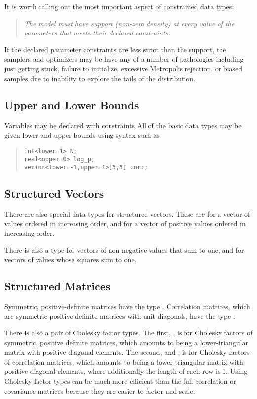 It is worth calling out the most important aspect of constrained data
types: 
%
\begin{quote}
\it
The model must have support (non-zero density) at every value of the
parameters that meets their declared constraints.
\end{quote}
%
If the declared parameter constraints are less strict than the
support, the samplers and optimizers may be have any of a number of
pathologies including just getting stuck, failure to initialize,
excessive Metropolis rejection, or biased samples due to inability to
explore the tails of the distribution.

\subsection{Upper and Lower Bounds}

Variables may be declared with constraints
All of the basic data types may be given lower and upper bounds using
syntax such as
%
\begin{quote}
\begin{Verbatim}
int<lower=1> N;
real<upper=0> log_p;
vector<lower=-1,upper=1>[3,3] corr;
\end{Verbatim}
\end{quote}

\subsection{Structured Vectors}

There are also special data types for structured vectors.  These are
 for a vector of values ordered in increasing order, and
 for a vector of positive values ordered in
increasing order.  

There is also a type  for vectors of non-negative values
that sum to one, and  for vectors of values whose
squares sum to one.

\subsection{Structured Matrices}

Symmetric, positive-definite matrices have the type
.  Correlation matrices, which are symmetric
positive-definite matrices with unit diagonals, have the type
.

There is also a pair of Cholesky factor types.  The first,
, is for Cholesky factors of symmetric,
positive definite matrices, which amounts to being a lower-triangular
matrix with positive diagonal elements.  The second, and
, is for Cholesky factors of correlation
matrices, which amounts to being a lower-triangular matrix with
positive diagonal elements, where additionally the length of each row
is 1.  Using Cholesky factor types can be much more efficient than the
full correlation or covariance matrices because they are easier to
factor and scale.



